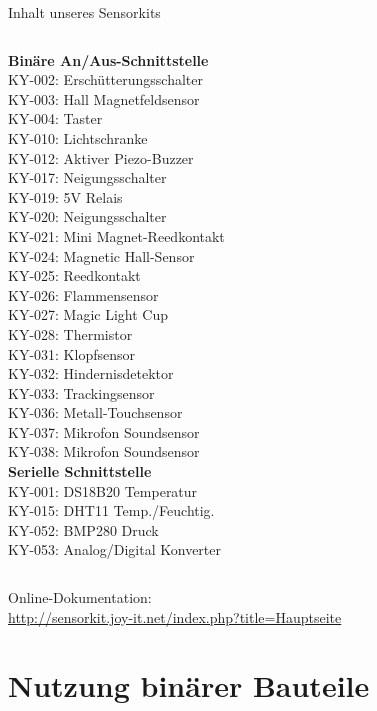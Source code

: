 {\begin{frame}{Inhalt unseres Sensorkits}
\begin{columns}[onlytextwidth]
        \textbf{Binäre An/Aus-Schnittstelle} \\
        KY-002: Erschütterungsschalter \\
        KY-003: Hall Magnetfeldsensor \\
        KY-004: Taster \\
        KY-010: Lichtschranke \\
        KY-012: Aktiver Piezo-Buzzer \\
        KY-017: Neigungsschalter \\
        KY-019: 5V Relais \\
        KY-020: Neigungsschalter \\
        KY-021: Mini Magnet-Reedkontakt \\
        KY-024: Magnetic Hall-Sensor \\
        KY-025: Reedkontakt \\
        KY-026: Flammensensor \\
        KY-027: Magic Light Cup \\
        KY-028: Thermistor \\
        KY-031: Klopfsensor \\
        KY-032: Hindernisdetektor \\
        KY-033: Trackingsensor \\
        KY-036: Metall-Touchsensor \\
        KY-037: Mikrofon Soundsensor \\
        KY-038: Mikrofon Soundsensor \\

        \textbf{Serielle Schnittstelle} \\
        KY-001: DS18B20 Temperatur \\
        KY-015: DHT11 Temp./Feuchtig. \\
        KY-052: BMP280 Druck \\
        KY-053: Analog/Digital Konverter \\
    \end{columns}

    \bigskip
    {
        \footnotesize
        Online-Dokumentation: \\
        \url{http://sensorkit.joy-it.net/index.php?title=Hauptseite}
    }
\end{frame}
}

\section{Nutzung binärer Bauteile}

